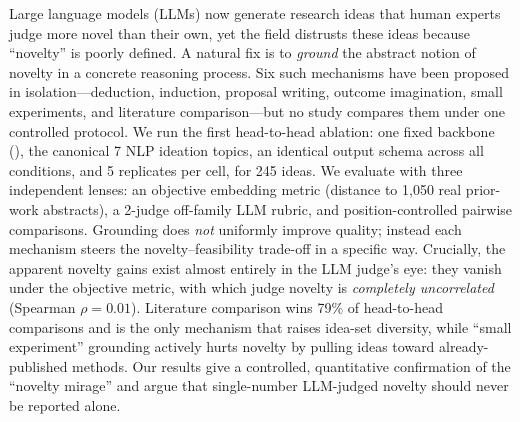 Large language models (LLMs) now generate research ideas that human experts judge more novel than their own, yet the field distrusts these ideas because ``novelty'' is poorly defined. A natural fix is to \emph{ground} the abstract notion of novelty in a concrete reasoning process. Six such mechanisms have been proposed in isolation---deduction, induction, proposal writing, outcome imagination, small experiments, and literature comparison---but no study compares them under one controlled protocol. We run the first head-to-head ablation: one fixed backbone (\gptfourone), the canonical 7 NLP ideation topics, an identical output schema across all conditions, and 5 replicates per cell, for 245 ideas. We evaluate with three independent lenses: an objective embedding metric (distance to 1{,}050 real prior-work abstracts), a 2-judge off-family LLM rubric, and position-controlled pairwise comparisons. Grounding does \emph{not} uniformly improve quality; instead each mechanism steers the novelty--feasibility trade-off in a specific way. Crucially, the apparent novelty gains exist almost entirely in the LLM judge's eye: they vanish under the objective metric, with which judge novelty is \emph{completely uncorrelated} (Spearman $\rho = 0.01$). Literature comparison wins 79\% of head-to-head comparisons and is the only mechanism that raises idea-set diversity, while ``small experiment'' grounding actively hurts novelty by pulling ideas toward already-published methods. Our results give a controlled, quantitative confirmation of the ``novelty mirage'' and argue that single-number LLM-judged novelty should never be reported alone.
